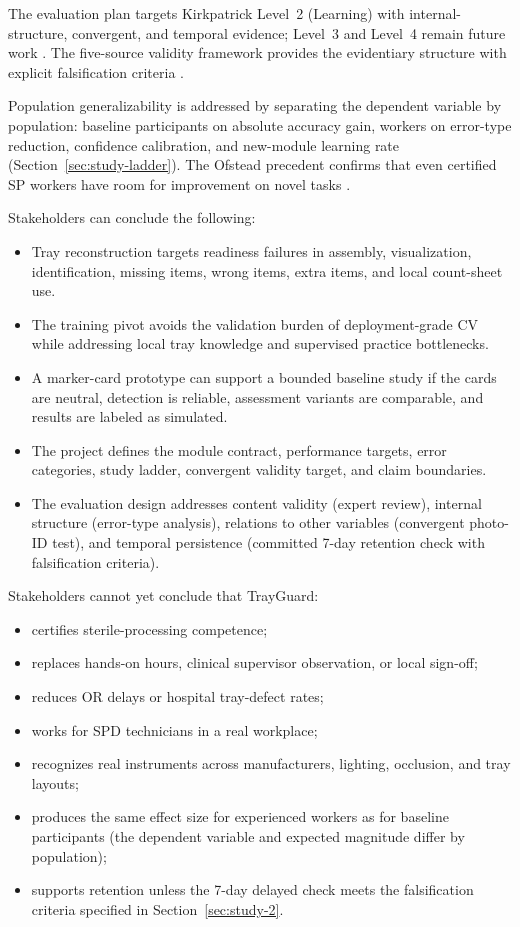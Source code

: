 \documentclass[10pt,a4paper]{article}
\begin{document}
The evaluation plan targets Kirkpatrick Level~2 (Learning) with internal-
structure, convergent, and temporal evidence; Level~3 and Level~4 remain
future work \cite{kirkpatrick-evaluation-1994}. The five-source validity
framework provides the evidentiary structure with explicit falsification
criteria \cite{cook-beckman-validity-2006}.

Population generalizability is addressed by separating the dependent variable by
population: baseline participants on absolute accuracy gain, workers on error-type reduction,
confidence calibration, and new-module learning rate (Section~\ref{sec:study-ladder}).
The Ofstead precedent confirms that even certified SP workers have room for
improvement on novel tasks \cite{ofstead-et-al-2023}.

Stakeholders can conclude the following:
\begin{itemize}
  \item Tray reconstruction targets readiness failures in assembly, visualization, identification, missing items, wrong items, extra items, and local count-sheet use.
  \item The training pivot avoids the validation burden of deployment-grade CV while addressing local tray knowledge and supervised practice bottlenecks.
  \item A marker-card prototype can support a bounded baseline study if the cards are neutral, detection is reliable, assessment variants are comparable, and results are labeled as simulated.
  \item The project defines the module contract, performance targets, error categories, study ladder, convergent validity target, and claim boundaries.
  \item The evaluation design addresses content validity (expert review), internal structure (error-type analysis), relations to other variables (convergent photo-ID test), and temporal persistence (committed 7-day retention check with falsification criteria).
\end{itemize}
Stakeholders cannot yet conclude that TrayGuard:
\begin{itemize}
  \item certifies sterile-processing competence;
  \item replaces hands-on hours, clinical supervisor observation, or local sign-off;
  \item reduces OR delays or hospital tray-defect rates;
  \item works for SPD technicians in a real workplace;
  \item recognizes real instruments across manufacturers, lighting, occlusion, and tray layouts;
  \item produces the same effect size for experienced workers as for baseline participants (the dependent variable and expected magnitude differ by population);
  \item supports retention unless the 7-day delayed check meets the falsification criteria specified in Section~\ref{sec:study-2}.
\end{itemize}
\end{document}
